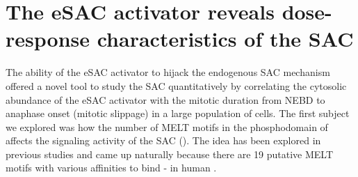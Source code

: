 \section{The eSAC activator reveals dose-response characteristics of the SAC}
The ability of the eSAC activator to hijack the endogenous SAC mechanism offered a novel tool to study the SAC quantitatively by correlating the cytosolic abundance of the eSAC activator with the mitotic duration from NEBD to anaphase onset (mitotic slippage) in a large population of cells. The first subject we explored was how the number of MELT motifs in the phosphodomain of  affects the signaling activity of the SAC (). The idea has been explored in previous studies and came up naturally because there are 19 putative MELT motifs with various affinities to bind - in human  \cite{RecombinantKNL1, MELTActivity}.

